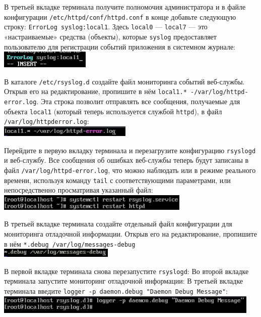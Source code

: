 \documentclass{beamer}
\begin{document}
\begin{frame}[plain]
	В третьей вкладке терминала получите полномочия администратора и в файле конфигурации \texttt{/etc/httpd/conf/httpd.conf} в конце добавьте следующую строку: \texttt{ErrorLog syslog:local1}. Здесь \texttt{local0} — \texttt{local7} — это «настраиваемые» средства (объекты), которые \texttt{syslog} предоставляет пользователю для регистрации событий приложения в системном журнале:
	\\\includegraphics{8.png}
\end{frame}
\begin{frame}[plain]
	В каталоге \texttt{/etc/rsyslog.d} создайте файл мониторинга событий веб-службы. Открыв его на редактирование, пропишите в нём \texttt{local1.* -/var/log/httpd-error.log}. Эта строка позволит отправлять все сообщения, получаемые для объекта \texttt{local1} (который теперь используется службой \texttt{httpd}), в файл \texttt{/var/log/httpderror.log}:
	\\\includegraphics{9.png}
\end{frame}
\begin{frame}[plain]
	Перейдите в первую вкладку терминала и перезагрузите конфигурацию \texttt{rsyslogd} и веб-службу. Все сообщения об ошибках веб-службы теперь будут записаны в файл \texttt{/var/log/httpd-error.log}, что можно наблюдать или в режиме реального времени, используя команду \texttt{tail} с соответствующими параметрами, или непосредственно просматривая указанный файл:
	\\\includegraphics{10.png}
\end{frame}
\begin{frame}[plain]
	В третьей вкладке терминала создайте отдельный файл конфигурации для мониторинга отладочной информации. Открыв его на редактирование, пропишите в нём \texttt{*.debug /var/log/messages-debug}
	\\\includegraphics{11.png}
\end{frame}
\begin{frame}[plain]
	В первой вкладке терминала снова перезапустите \texttt{rsyslogd}:
	Во второй вкладке терминала запустите мониторинг отладочной информации:
	В третьей вкладке терминала введите \texttt{logger -p daemon.debug "Daemon Debug Message"}:
	\\\includegraphics{12.png}
\end{frame}
\end{document}
